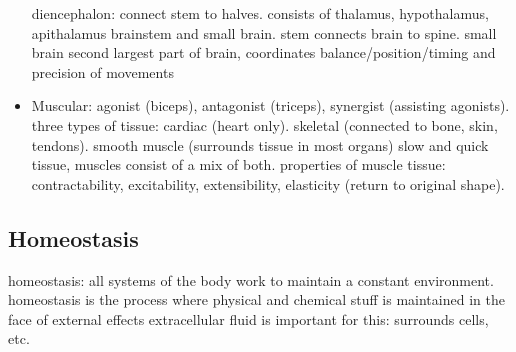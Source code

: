 \begin{itemize}
    diencephalon: connect stem to halves. consists of thalamus, hypothalamus, apithalamus
    brainstem and small brain. stem connects brain to spine. small brain second largest part of brain, coordinates balance/position/timing and precision of movements
  \item Muscular: agonist (biceps), antagonist (triceps), synergist (assisting agonists).
    three types of tissue: cardiac (heart only). skeletal (connected to bone, skin, tendons). smooth muscle (surrounds tissue in most organs)
    slow and quick tissue, muscles consist of a mix of both.
    properties of muscle tissue: contractability, excitability, extensibility, elasticity (return to original shape).
\end{itemize}

\subsection{Homeostasis}
homeostasis: all systems of the body work to maintain a constant environment. homeostasis is the process where physical and chemical stuff is maintained in the face of external effects
extracellular fluid is important for this: surrounds cells, etc.
